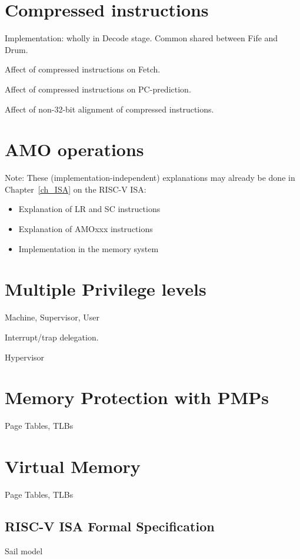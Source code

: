 
\section{Compressed instructions}

Implementation: wholly in Decode stage.  Common shared between Fife and Drum.

Affect of compressed instructions on Fetch.

Affect of compressed instructions on PC-prediction.

Affect of non-32-bit alignment of compressed instructions.


\section{AMO operations}

Note: These (implementation-independent) explanations may already be
done in Chapter~\ref{ch_ISA} on the RISC-V ISA:

\begin{itemize}
  \item Explanation of LR and SC instructions
  \item Explanation of AMOxxx instructions
  \item Implementation in the memory system
\end{itemize}


\section{Multiple Privilege levels}

Machine, Supervisor, User

Interrupt/trap delegation.

Hypervisor


\section{Memory Protection with PMPs}

Page Tables, TLBs


\section{Virtual Memory}

Page Tables, TLBs


\subsection{RISC-V ISA Formal Specification}

Sail model

